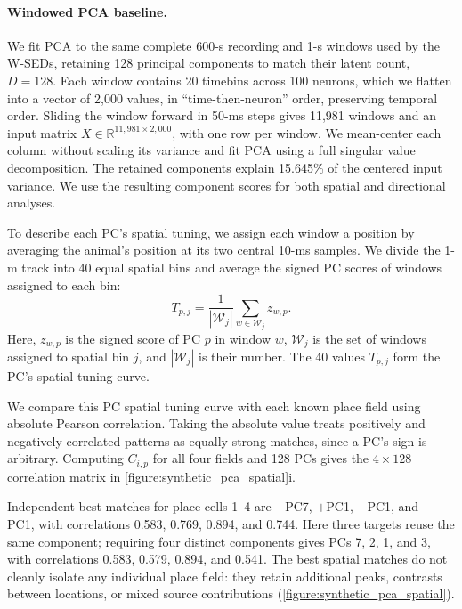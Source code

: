 \paragraph{Windowed PCA baseline.}
We fit PCA to the same complete 600-s recording and 1-s windows used by the W-SEDs, retaining 128 principal components to match their latent count, $D=128$. Each window contains 20 timebins across 100 neurons, which we flatten into a vector of 2,000 values, in ``time-then-neuron'' order, preserving temporal order. Sliding the window forward in 50-ms steps gives 11,981 windows and an input matrix $X\in\mathbb{R}^{11{,}981\times2{,}000}$, with one row per window. We mean-center each column without scaling its variance and fit PCA using a full singular value decomposition. The retained components explain 15.645\% of the centered input variance. We use the resulting component scores for both spatial and directional analyses.

To describe each PC's spatial tuning, we assign each window a position by averaging the animal's position at its two central 10-ms samples. We divide the 1-m track into 40 equal spatial bins and average the signed PC scores of windows assigned to each bin:
\begin{equation}
\label{eq:pca_spatial_tuning}
T_{p,j}=\frac{1}{|\mathcal{W}_j|}\sum_{w\in\mathcal{W}_j}z_{w,p}.
\end{equation}
Here, $z_{w,p}$ is the signed score of PC $p$ in window $w$, $\mathcal{W}_j$ is the set of windows assigned to spatial bin $j$, and $|\mathcal{W}_j|$ is their number. The 40 values $T_{p,j}$ form the PC's spatial tuning curve.

We compare this PC spatial tuning curve with each known place field using absolute Pearson correlation. Taking the absolute value treats positively and negatively correlated patterns as equally strong matches, since a PC's sign is arbitrary. Computing $C_{i,p}$ for all four fields and 128 PCs gives the $4\times128$ correlation matrix in \autoref{figure:synthetic_pca_spatial}i.

Independent best matches for place cells 1--4 are $+$PC7, $+$PC1, $-$PC1, and $-$PC1, with correlations 0.583, 0.769, 0.894, and 0.744. Here three targets reuse the same component; requiring four distinct components gives PCs 7, 2, 1, and 3, with correlations 0.583, 0.579, 0.894, and 0.541. The best spatial matches do not cleanly isolate any individual place field: they retain additional peaks, contrasts between locations, or mixed source contributions (\autoref{figure:synthetic_pca_spatial}).

